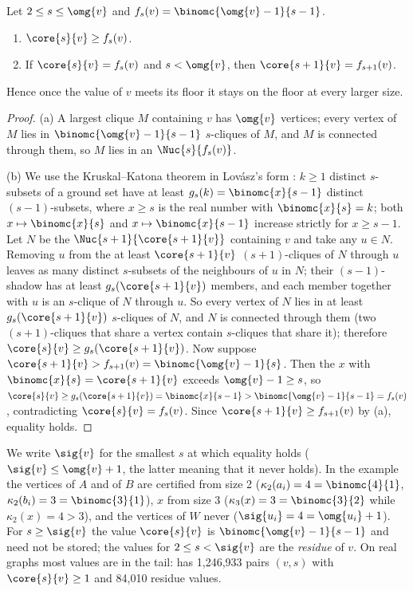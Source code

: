 \begin{theorem}\label{thm:tail}
Let $2\le s\le\omg{v}$ and $f_s(v)=\binomc{\omg{v}-1}{s-1}$.
\begin{enumerate}[label=(\alph*),leftmargin=*,nosep]
\item $\core{s}{v}\ge f_s(v)$.
\item If $\core{s}{v}=f_s(v)$ and $s<\omg{v}$, then $\core{s+1}{v}=f_{s+1}(v)$.
\end{enumerate}
Hence once the value of $v$ meets its floor it stays on the floor at every larger size.
\end{theorem}
\begin{proof}
(a) A largest clique $M$ containing $v$ has $\omg{v}$ vertices; every vertex of $M$ lies in $\binomc{\omg{v}-1}{s-1}$ $s$-cliques of $M$, and $M$ is connected through them, so $M$ lies in an $\Nuc{s}{f_s(v)}$.

(b) We use the Kruskal--Katona theorem in Lov\'asz's form \cite{kruskal1963,katona1968,lovasz1979}: $k\ge1$ distinct $s$-subsets of a ground set have at least $g_s(k)=\binomc{x}{s-1}$ distinct $(s-1)$-subsets, where $x\ge s$ is the real number with $\binomc{x}{s}=k$; both $x\mapsto\binomc{x}{s}$ and $x\mapsto\binomc{x}{s-1}$ increase strictly for $x\ge s-1$.
Let $N$ be the $\Nuc{s+1}{\core{s+1}{v}}$ containing $v$ and take any $u\in N$.
Removing $u$ from the at least $\core{s+1}{v}$ $(s+1)$-cliques of $N$ through $u$ leaves as many distinct $s$-subsets of the neighbours of $u$ in $N$; their $(s-1)$-shadow has at least $g_s(\core{s+1}{v})$ members, and each member together with $u$ is an $s$-clique of $N$ through $u$.
So every vertex of $N$ lies in at least $g_s(\core{s+1}{v})$ $s$-cliques of $N$, and $N$ is connected through them (two $(s+1)$-cliques that share a vertex contain $s$-cliques that share it); therefore $\core{s}{v}\ge g_s(\core{s+1}{v})$.
Now suppose $\core{s+1}{v}>f_{s+1}(v)=\binomc{\omg{v}-1}{s}$.
Then the $x$ with $\binomc{x}{s}=\core{s+1}{v}$ exceeds $\omg{v}-1\ge s$, so $\core{s}{v}\ge g_s(\core{s+1}{v})=\binomc{x}{s-1}>\binomc{\omg{v}-1}{s-1}=f_s(v)$, contradicting $\core{s}{v}=f_s(v)$.
Since $\core{s+1}{v}\ge f_{s+1}(v)$ by (a), equality holds.
\end{proof}

We write $\sig{v}$ for the smallest $s$ at which equality holds ($\sig{v}\le\omg{v}+1$, the latter meaning that it never holds).
In the example the vertices of $A$ and of $B$ are certified from size 2 ($\kappa_2(a_i)=4=\binomc{4}{1}$, $\kappa_2(b_i)=3=\binomc{3}{1}$), $x$ from size 3 ($\kappa_3(x)=3=\binomc{3}{2}$ while $\kappa_2(x)=4>3$), and the vertices of $W$ never ($\sig{u_i}=4=\omg{u_i}+1$).
For $s\ge\sig{v}$ the value $\core{s}{v}$ is $\binomc{\omg{v}-1}{s-1}$ and need not be stored; the values for $2\le s<\sig{v}$ are the \emph{residue} of $v$.
On real graphs most values are in the tail: \dblp has 1,246,933 pairs $(v,s)$ with $\core{s}{v}\ge1$ and 84,010 residue values.
